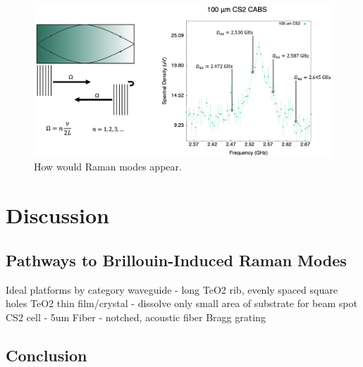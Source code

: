 \begin{figure}[t]
  \centering
  \includegraphics[width=\textwidth]{figs/4-Raman/HowWouldRamanModesAppear.png}
  \caption{How would Raman modes appear.}
  \label{fig:HowWouldRamanModesAppear}
\end{figure}


\section{Discussion}
\label{sec:Raman:Discussion}

\subsection{Pathways to Brillouin-Induced Raman Modes}
\label{subsec:Raman:Pathways}
Ideal platforms by category
  waveguide - long TeO2 rib, evenly spaced square holes
  TeO2 thin film/crystal - dissolve only small area of substrate for beam spot
  CS2 cell - 5um
  Fiber - notched, acoustic fiber Bragg grating

\subsection{Conclusion}
\label{subsec:Raman:Conclusion}


\clearpage
\thispagestyle{empty}
\null
\newpage

